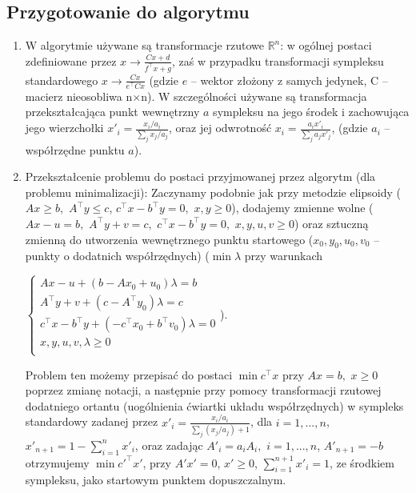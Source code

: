 \documentclass[licencjacka]{pracamgr}
\begin{document}
   \subsection{Przygotowanie do algorytmu}
\begin{enumerate}
\item W algorytmie używane są transformacje rzutowe $\mathbb{R}^n$: w ogólnej postaci zdefiniowane przez $x\rightarrow\frac{Cx+d}{f^{\top}x+g}$, zaś
w przypadku transformacji sympleksu standardowego $x\rightarrow\frac{Cx}{e^{\top}Cx}$ (gdzie $e$ -- wektor złożony z samych jedynek, C -- macierz nieosobliwa n$\times$n).
W szczególności używane są transformacja przekształcająca punkt wewnętrzny $a$ sympleksu na jego środek i zachowująca jego wierzchołki $x'_i=\frac{x_i/a_i}{\sum\limits_{j}x_j/a_j}$,\newline
oraz jej odwrotność $x_i=\frac{a_ix'_i}{\sum\limits_{j}a_jx'_j}$, (gdzie $a_i$ -- współrzędne punktu $a$).
%
\item Przekształcenie problemu do postaci przyjmowanej przez algorytm (dla problemu minimalizacji):\newline
Zaczynamy podobnie jak przy metodzie elipsoidy ($Ax\ge b,$ $A^{\top}y\le c$, $c^{\top}x-b^{\top}y=0,$ $x,y\ge0$),
dodajemy zmienne wolne ($Ax-u=b,$ $A^{\top}y+v=c,$ $c^{\top}x-b^{\top}y=0,$ $x,y,u,v\ge0$)
oraz sztuczną zmienną do utworzenia wewnętrznego punktu startowego ($x_0,y_0,u_0,v_0$ -- punkty o dodatnich współrzędnych)
($\min \lambda$ przy warunkach
\begin{center}$\left\{\begin{array}{c} 
Ax-u+(b-Ax_0+u_0)\lambda=b\\
A^{\top}y+v+(c-A^{\top}y_0)\lambda=c\\
c^{\top}x-b^{\top}y+(-c^{\top}x_0+b^{\top}v_0)\lambda=0\\
x,y,u,v,\lambda\ge0\\
\end{array}\right.$).\end{center}
%
Problem ten możemy przepisać do postaci $\min c^{\top}x$ przy $Ax=b,$ $x\ge0$ poprzez zmianę notacji,
a następnie przy pomocy transformacji rzutowej dodatniego ortantu (uogólnienia ćwiartki układu współrzędnych) w sympleks standardowy zadanej przez
$x'_i=\frac{x_i/a_i}{\sum\limits_{j}(x_j/a_j)+1}$, dla $i=1,...,n$, $x'_{n+1}=1-\sum\limits_{i=1}^{n}x'_i$, oraz zadając $A'_i=a_iA_i,$ $i=1,...,n$, $A'_{n+1}=-b$\newline
otrzymujemy $\min c'^{\top}x'$, przy $A'x'=0$, $x'\ge0$, $\sum\limits_{i=1}^{n+1}x'_i=1$, ze środkiem sympleksu, jako startowym punktem dopuszczalnym.
\end{enumerate}
\end{document}

